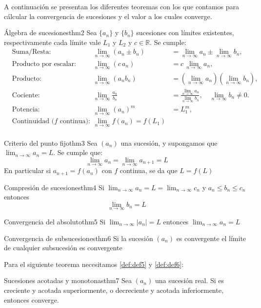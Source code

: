 A continuación se presentan los diferentes teoremas con los que contamos para cálcular la convergencia de sucesiones y el valor a los cuales converge.

\begin{teorema}{Álgebra de sucesiones}{thm2}
    Sea $\{a_n\}$ y $\{b_n\}$ sucesiones con límites existentes, respectivamente cada límite vale $L_1$ y $L_2$ y $c\in\mathbb{R}$. Se cumple:
    \[
    \begin{aligned}
        &\text{Suma/Resta:} & \lim_{n \to \infty} (a_n \pm b_n) &= \lim_{n \to \infty} a_n \pm \lim_{n \to \infty} b_n,\\
        &\text{Producto por escalar:} & \lim_{n \to \infty} (c\,a_n) &= c\,\lim_{n \to \infty} a_n,\\
        &\text{Producto:} & \lim_{n \to \infty} (a_n b_n) &= (\lim_{n \to \infty} a_n)(\lim_{n \to \infty} b_n),\\
        &\text{Cociente:} & \lim_{n \to \infty} \frac{a_n}{b_n} &= \frac{\lim\limits_{n \to \infty} a_n}{\lim\limits_{n \to \infty} b_n}, \quad \lim_{n\to\infty} b_n \neq 0. \\
        &\text{Potencia:} & \lim_{n \to \infty} (a_n)^m &= L_1^m,\\
        &\text{Continuidad ($f$ continua): } & \lim_{n \to \infty}f(a_n) = f(L_1) \\
    \end{aligned}
    \]
\end{teorema}

\begin{teorema}{Criterio del punto fijo}{thm3}
    Sea $(a_n)$ una sucesión, y supongamos que $\lim_{n \to \infty} a_n = L$. Se cumple que:
    \[ 
        \lim_{n \to \infty} a_n = \lim_{n \to \infty} a_{n + 1} = L
    \]
    En particular si $a_{n + 1} = f(a_n)$ con $f$ continua, se da que $L = f(L)$
\end{teorema}

\begin{teorema}{Compresión de sucesiones}{thm4}
    Si $\lim_{n \to \infty} a_n = L = \lim_{n \to \infty} c_n$ y $a_n \leq b_n \leq c_n$ entonces
    \[ 
        \lim_{n \to \infty} b_n = L
    \]
\end{teorema}

\begin{teorema}{Convergencia del absoluto}{thm5}
    Si $\lim_{n \to \infty} \lvert a_n \rvert = L$ entonces $\lim_{n \to \infty} a_n = L$
\end{teorema}

\begin{teorema}{Convergencia de subsucesiones}{thm6}
    Si la sucesión $(a_n)$ es convergente el límite de cualquier subsucesión es convergente
\end{teorema}

Para el siguiente teorema necesitamos \ref{def:def5} y \ref{def:def6}:

\begin{teorema}{Sucesiones acotadas y monotonas}{thm7}
    Sea $(a_n)$ una sucesión real. 
    Si es creciente y acotada superiormente, o decreciente y acotada inferiormente, entonces converge.
\end{teorema}

